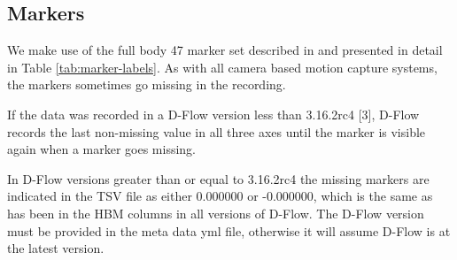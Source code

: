 \documentclass[10pt,a4paper,twocolumn]{article}
\begin{document}
\subsection*{Markers}
%
We make use of the full body 47 marker set described in \cite{Ton's HBM paper}
and presented in detail in Table \ref{tab:marker-labels}. As with all camera
based motion capture systems, the markers sometimes go missing in the
recording.

If the data was recorded in a D-Flow version less than 3.16.2rc4 [3], D-Flow
records the last non-missing value in all three axes until the marker is
visible again when a marker goes missing.

In D-Flow versions greater than or equal to 3.16.2rc4 the missing markers are
indicated in the TSV file as either 0.000000 or -0.000000, which is the same as
has been in the HBM columns in all versions of D-Flow. The D-Flow version must
be provided in the meta data yml file, otherwise it will assume D-Flow is at
the latest version.
\end{document}
